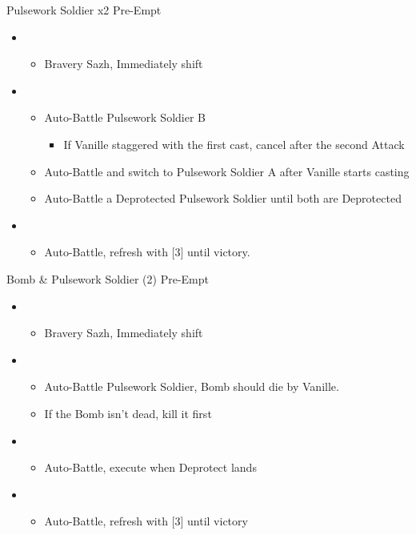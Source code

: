 	\begin{battle}[0:24]{Pulsework Soldier x2 Pre-Empt}
		\begin{itemize}
			\item \second
			      \begin{itemize}
				      \item Bravery Sazh, Immediately shift
			      \end{itemize}
			\item \third
			      \begin{itemize}
				      \item Auto-Battle Pulsework Soldier B
				            \begin{itemize}
					            \item If Vanille staggered with the first cast, cancel after the second Attack
				            \end{itemize}
				      \item Auto-Battle and switch to Pulsework Soldier A after Vanille starts casting
				      \item Auto-Battle a Deprotected Pulsework Soldier until both are Deprotected
			      \end{itemize}
			\item \first
			      \begin{itemize}
				      \item Auto-Battle, refresh with [3] until victory.
			      \end{itemize}
		\end{itemize}
	\end{battle}
	\begin{battle}[0:21]{Bomb \& Pulsework Soldier (2) Pre-Empt}
		\begin{itemize}
			\item \second
			      \begin{itemize}
				      \item Bravery Sazh, Immediately shift
			      \end{itemize}
			\item \first
			      \begin{itemize}
				      \item Auto-Battle Pulsework Soldier, Bomb should die by Vanille.
				      \item If the Bomb isn't dead, kill it first
			      \end{itemize}
			\item \third
			      \begin{itemize}
				      \item Auto-Battle, execute when Deprotect lands
			      \end{itemize}
			\item \first
			      \begin{itemize}
				      \item Auto-Battle, refresh with [3] until victory
			      \end{itemize}
		\end{itemize}
	\end{battle}


